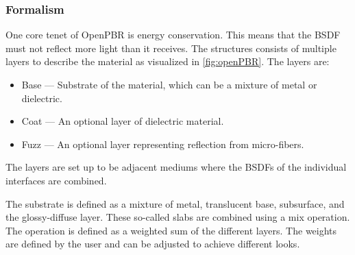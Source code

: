 \subsubsection{Formalism}

One core tenet of \gls{OpenPBR} is energy conservation. This means that the \gls{BSDF} must not reflect more light than it receives. The structures consists of multiple layers to describe the material as visualized in \autoref{fig:openPBR}. The layers are:

\begin{itemize}
  \item{Base} — Substrate of the material, which can be a mixture of metal or dielectric.
  \item{Coat} — An optional layer of dielectric material.
  \item{Fuzz} — An optional layer representing reflection from micro-fibers.
\end{itemize}

The layers are set up to be adjacent mediums where the \glspl{BSDF} of the individual interfaces are combined.

The substrate is defined as a mixture of metal, translucent base, subsurface, and the glossy-diffuse layer. These so-called slabs are combined using a mix operation. The operation is defined as a weighted sum of the different layers. The weights are defined by the user and can be adjusted to achieve different looks.

